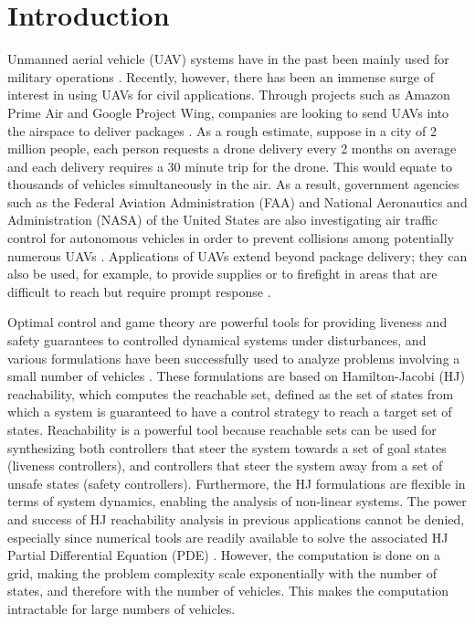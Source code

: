 \section{Introduction}
Unmanned aerial vehicle (UAV) systems have in the past been mainly used for military operations \cite{Tice91}. Recently, however, there has been an immense surge of interest in using UAVs for civil applications. Through projects such as Amazon Prime Air and Google Project Wing, companies are looking to send UAVs into the airspace to deliver packages \cite{PrimeAir,ProjectWing}. As a rough estimate, suppose in a city of 2 million people, each person requests a drone delivery every 2 months on average and each delivery requires a 30 minute trip for the drone. This would equate to thousands of vehicles simultaneously in the air. As a result, government agencies such as the Federal Aviation Administration (FAA) and National Aeronautics and Administration (NASA) of the United States are also investigating air traffic control for autonomous vehicles in order to prevent collisions among potentially numerous UAVs \cite{FAA13}. Applications of UAVs extend beyond package delivery; they can also be used, for example, to provide supplies or to firefight in areas that are difficult to reach but require prompt response \cite{Debusk10}.

Optimal control and game theory are powerful tools for providing liveness and safety guarantees to controlled dynamical systems under disturbances, and various formulations \cite{Bokanowski10,Mitchell05,Barron89} have been successfully used to analyze problems involving a small number of vehicles \cite{Fisac15,Chen14,Ding08}. These formulations are based on Hamilton-Jacobi (HJ) reachability, which computes the reachable set, defined as the set of states from which a system is guaranteed to have a control strategy to reach a target set of states. Reachability is a powerful tool because reachable sets can be used for synthesizing both controllers that steer the system towards a set of goal states (liveness controllers), and controllers that steer the system away from a set of unsafe states (safety controllers). Furthermore, the HJ formulations are flexible in terms of system dynamics, enabling the analysis of non-linear systems. The power and success of HJ reachability analysis in previous applications cannot be denied, especially since numerical tools are readily available to solve the associated HJ Partial Differential Equation (PDE) \cite{LSToolbox,Osher02,Sethian96}. However, the computation is done on a grid, making the problem complexity scale exponentially with the number of states, and therefore with the number of vehicles. This makes the computation intractable for large numbers of vehicles. 

